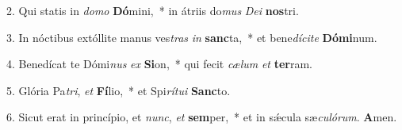 2. Qui statis in \textit{do}\textit{mo} \textbf{Dó}mini,~*  in átriis do\textit{mus} \textit{De}\textit{i} \textbf{nos}tri.\

3. In nóctibus extóllite manus ves\textit{tras} \textit{in} \textbf{sanc}ta,~*  et bene\textit{dí}\textit{ci}\textit{te} \textbf{Dó}\textbf{mi}num.\

4. Benedícat te Dómi\textit{nus} \textit{ex} \textbf{Si}on,~*  qui fecit \textit{cæ}\textit{lum} \textit{et} \textbf{ter}ram.\

5. Glória Pa\textit{tri}, \textit{et} \textbf{Fí}lio,~*  et Spi\textit{rí}\textit{tu}\textit{i} \textbf{Sanc}to.\

6. Sicut erat in princípio, et \textit{nunc}, \textit{et} \textbf{sem}per,~*  et in sǽcula sæ\textit{cu}\textit{ló}\textit{rum}. \textbf{A}men.\

